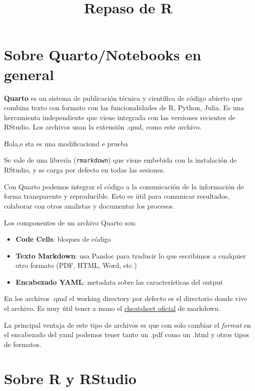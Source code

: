 \documentclass[
  letterpaper,
  DIV=11,
  numbers=noendperiod]{scrartcl}
\title{Repaso de R}
\author{}
\date{}
\renewcommand*\contentsname{Table of contents}
\newcommand\contentsname{Table of contents}
\begin{document}
\maketitle

\renewcommand*\contentsname{Table of contents}
{
\setcounter{tocdepth}{3}
\tableofcontents
}

\section{Sobre Quarto/Notebooks en
general}\label{sobre-quartonotebooks-en-general}

\textbf{Quarto} es un sistema de publicación técnica y científica de
código abierto que combina texto con formato con las funcionalidades de
R, Python, Julia. Es una herramienta independiente que viene integrada
con las versiones recientes de RStudio. Los archivos usan la extensión
.qmd, como este archivo.

Hola,e sta es una modificaciond e prueba

Se vale de una librería (\texttt{rmarkdown}) que viene embebida con la
instalación de RStudio, y se carga por defecto en todas las sesiones.

Con Quarto podemos integrar el código a la comunicación de la
información de forma transparente y reproducible. Esto es útil para
comunicar resultados, colaborar con otros analistas y documentar los
procesos.

Los componentes de un archivo Quarto son:

\begin{itemize}
\item
  \textbf{Code Cells}: bloques de código
\item
  \textbf{Texto Markdown}: usa Pandoc para traducir lo que escribimos a
  cualquier otro formato (PDF, HTML, Word, etc.)
\item
  \textbf{Encabezado YAML}: metadata sobre las características del
  output
\end{itemize}

En los archivos .qmd el working directory por defecto es el directorio
donde vive el archivo. Es muy útil tener a mano el
\href{https://github.com/rstudio/cheatsheets/blob/master/rmarkdown-2.0.pdf}{cheatsheet
oficial} de markdown.

La principal ventaja de este tipo de archivos es que con solo cambiar el
\emph{format} en el encabezado del yaml podemos tener tanto un .pdf como
un .html y otros tipos de formatos.

\section{Sobre R y RStudio}\label{sobre-r-y-rstudio}
\end{document}
